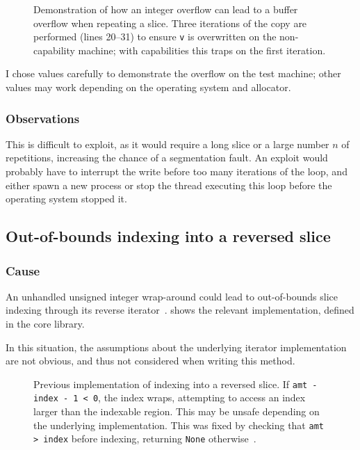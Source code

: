 \documentclass[dissertation.tex]{subfiles}
\begin{document}
\begin{figure}[ht]
    
    \caption{
        Demonstration of how an integer overflow can lead to a buffer
        overflow when repeating a slice.
        Three iterations of the copy are performed (lines 20--31) to
        ensure \texttt{v} is overwritten on the non-capability machine;
        with capabilities this traps on the first iteration.
    }
    \label{lst:micro-repeat}
\end{figure}

I chose values carefully to demonstrate the overflow on the test
machine; other values may work depending on the operating system and
allocator.

\subsubsection{Observations}
This is difficult to exploit, as it would require a long slice or a
large number \(n\) of repetitions, increasing the chance of a
segmentation fault.
An exploit would probably have to interrupt the write before too many
iterations of the loop, and either spawn a new process or stop the
thread executing this loop before the operating system stopped it.


\subsection{Out-of-bounds indexing into a reversed slice}

\subsubsection{Cause}
An unhandled unsigned integer wrap-around could lead to out-of-bounds
slice indexing through its reverse iterator~\cite{rust-pr-reverse}.
 shows the relevant implementation, defined in the
core library.

In this situation, the assumptions about the underlying iterator
implementation are not obvious, and thus not considered when writing
this method.

\begin{figure}[ht]
    
    \caption{
        Previous implementation of indexing into a reversed slice.
        If \texttt{amt - index - 1 < 0}, the index wraps, attempting to
        access an index larger than the indexable region.
        This may be unsafe depending on the underlying implementation.
        This was fixed by checking that \texttt{amt > index} before
        indexing, returning \texttt{None}
        otherwise~\cite{rust-commit-reverse}.
    }
    \label{lst:bug-reverse}
\end{figure}
\end{document}
